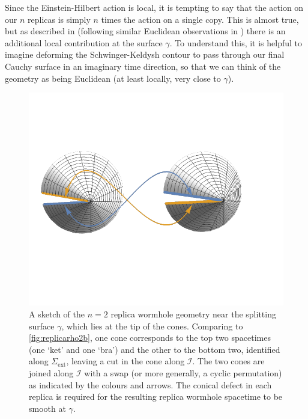 \documentclass[letterpaper,12pt]{article}
\newcommand*{\island}{\mathcal{I}}
\begin{document}
Since the Einstein-Hilbert action is local, it is tempting to say that the action on our $n$ replicas is simply $n$ times the action on a single copy. This is almost true, but as described in \cite{Dong:2016hjy} (following similar Euclidean observations in \cite{Lewkowycz:2013nqa}) there is an additional local contribution at the surface $\gamma$. To understand this, it is helpful to imagine deforming the Schwinger-Keldysh contour to pass through our final Cauchy surface in an imaginary time direction, so that we can think of the geometry as being Euclidean (at least locally, very close to $\gamma$).
\begin{figure}
\centering
	\includegraphics[width=.8\textwidth]{cones}
\caption{A sketch of the $n=2$ replica wormhole geometry near the splitting surface $\gamma$, which lies at the tip of the cones. Comparing to \ref{fig:replicarho2b}, one cone corresponds to the top two spacetimes (one `ket' and one `bra') and the other to the bottom two, identified along $\Sigma_\mathrm{ext}$, leaving a cut in the cone along $\island$. The two cones are joined along $\island$ with a swap (or more generally, a cyclic permutation) as indicated by the colours and arrows. The conical defect in each replica is required for the resulting replica wormhole spacetime to be smooth at $\gamma$. \label{fig:cones}}
\end{figure}
\end{document}

